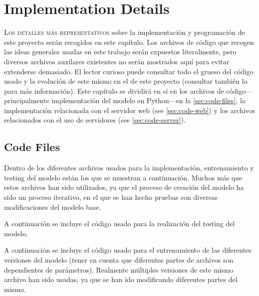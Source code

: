 

\chapter{Implementation Details}\label{cha:code}



\lettrine{L}{os detalles más representativos} sobre la implementación y
programación de este proyecto serán recogidos en este capítulo. Los archivos de
código que recogen las ideas generales usadas en este trabajo serán expuestos
literalmente, pero diversos archivos auxilares existentes no serán mostrados
aquí para evitar extenderse demasiado. El lector curioso puede consultar todo
el grueso del código usado y la evolución de este mismo en el
 de este proyecto (consultar también la
 para más información). Este capítulo
se dividirá en sí en los archivos de código---principalmente implementación del
modelo en Python---en la \vref{sec:code-files}, la implementación relacionada
con el servidor web (see \vref{sec:code-web}) y los archivos relacionados con
el uso de servidores (see \vref{sec:code-server}).


\section{Code Files}\label{sec:code-files}

Dentro de los diferentes archivos usados para la implementación, entrenamiento
y testing del modelo están los que se muestran a continuación. Muchos más que
estos archivos han sido utilizados, ya que el proceso de creación del modelo ha
sido un proceso iterativo, en el que se han hecho pruebas con diversas
modificaciones del modelo base.

A continuación se incluye el código usado para la realización del testing del
modelo.


A continuación se incluye el código usado para el entrenamiento de las
diferentes versiones del modelo (tener en cuenta que diferentes partes de
archivos son dependientes de parámetros). Realmente múltiples versiones de este
mismo archivo han sido usadas, ya que se han ido modificando diferentes partes
del mismo.

